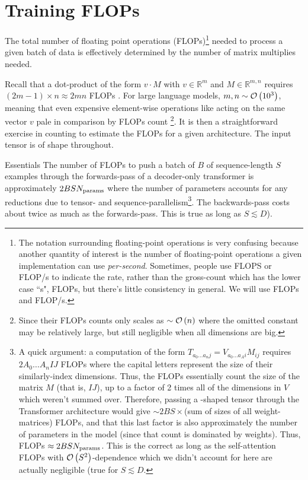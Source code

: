 \documentclass[11pt]{article}
\begin{document}
\section{Training FLOPs \label{sec_flops_training} }

The total number of floating point operations (FLOPs)\footnote{The notation surrounding
floating-point operations is very confusing because another quantity of interest is the number
of floating-point operations a given implementation can use \textit{per-second}. Sometimes,
people use FLOPS or FLOP/s to indicate the rate, rather than the gross-count which has the lower
case ``s", FLOPs, but there's little consistency in general. We will use FLOPs and FLOP/s.}  needed to process a given batch of
data is effectively determined by the number of matrix multiplies needed.

Recall that a dot-product of the form $ v \cdot M $  with $ v \in \mathbb{R}^{ m } $ and $ M \in
\mathbb{R} ^{ m, n }$ requires $ \left (2 m-1 \right )\times n \approx 2mn$ FLOPs .
For large language models, $ m,n \sim \mathcal{O} \left( 10 ^{ 3 } \right)  $, meaning that even expensive
element-wise operations like  acting on the same vector $ v $ pale in comparison by
FLOPs count \footnote{Since their FLOPs counts only scales as $ \sim \mathcal{O} \left( n\right )  $ where
the omitted constant may be relatively large, but still negligible when all dimensions are big.}. It
is then a straightforward exercise in counting to estimate the FLOPs for a given architecture. The
input tensor is of shape  throughout.

\begin{nicebox}{Essentials}
    The number of FLOPs to push a batch of $ B $ of sequence-length $ S $ examples through the forwards-pass
    of a decoder-only transformer is approximately $ 2BS N _{ {\rm params}  } $ where the number of
    parameters accounts for any reductions due to tensor- and sequence-parallelism\footnote{A quick argument: a
computation of the form $T _{ a _{ 0 }\ldots  a _{ n }j } =V _{ a _{ 0 }\ldots a _{ A
}i }M _{ ij } $ requires $ 2A _{ 0 }\ldots A _{ n }IJ $ FLOPs where the capital letters
represent the size of their similarly-index dimensions. Thus, the FLOPs
essentially count the size of the matrix $ M $ (that is, $ IJ $), up to a factor of 2 times all of the
dimensions in $ V $ which weren't summed over. Therefore, passing a
-shaped tensor through the Transformer architecture would give $ \sim 2BS\times
$(sum of sizes of all weight-matrices) FLOPs, and that this last factor is also approximately the number of
parameters in the model (since that count is dominated by weights). Thus, FLOPs $ \approx 2BSN _{
{\rm params}  } $. This is the correct as long as the self-attention FLOPs with $ \mathcal{O} \left( S ^{ 2 } \right)$-dependence which we
didn't account for here are actually negligible (true for $ S \lesssim D $.}. The backwards-pass
    costs about twice as much as the forwards-pass. This is true as long as $ S \lesssim D $).
\end{nicebox}
\end{document}

